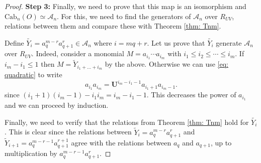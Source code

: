\documentclass{amsart}
\newtheorem{theorem}{Theorem}[section]
\newtheorem{corollary}[theorem]{Corollary}
\newtheorem{lemma}[theorem]{Lemma}
\newcommand{\CA}{\mathcal{A}}
\newcommand{\Cab}{\mathrm{Cab}}
\newcommand{\cHFL}{\mathcal{H\!F\! L}}
\newcommand{\UU}{\mathbf{U}}
\begin{document}
\begin{proof}
{\bf Step 3:} Finally, we need to prove that this map is an isomorphism and $\Cab_n(O)\simeq \CA_n$. For this, we need to find the generators of $\CA_n$ over $R_{UV}$, relations between them and compare these with Theorem \ref{thm: Tnm}. 

Define $\widetilde{Y_i}=a_{q}^{m-r}a_{q+1}^{r}\in \CA_n$ where $i=mq+r$. Let us prove that $\widetilde{Y_i}$ generate $\CA_n$ over $R_{UV}$. Indeed, consider a monomial $M=a_{i_1}\cdots a_{i_m}$ with $i_1\le i_2\le \cdots \le i_m$. If $i_m-i_1\le 1$ then $M=\widetilde{Y}_{i_1+\ldots+i_m}$ by the above. Otherwise we can use \eqref{eq: quadratic} to write
$$
a_{i_1}a_{i_m}=\UU^{i_m-i_1-1}a_{i_1+1}a_{i_m-1}.
$$ 
since $(i_1+1)(i_m-1)-i_1i_m=i_m-i_1-1$.
This decreases the power of $a_{i_1}$ and we can proceed by induction.

Finally, we need to verify that the relations from Theorem \ref{thm: Tnm}  hold for $\widetilde{Y_i}$. This is clear since the relations between
$\widetilde{Y}_i=a_{q}^{m-r}a_{q+1}^{r}$ and $\widetilde{Y}_{i+1}=a_{q}^{m-r-1}a_{q+1}^{r+1}$ agree with the relations between $a_{q}$ and $a_{q+1}$,
up to multiplication by $a_{q}^{m-r-1}a_{q+1}^{r}$. 
\end{proof}

 





 

 


\end{document}

